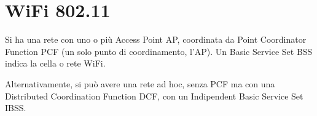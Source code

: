 \section{WiFi 802.11}

Si ha una rete con uno o più Access Point AP, coordinata da Point Coordinator Function PCF (un solo punto di coordinamento, l'AP). Un Basic Service Set BSS indica la cella o rete WiFi.

Alternativamente, si può avere una rete ad hoc, senza PCF ma con una Distributed Coordination Function DCF, con un Indipendent Basic Service Set IBSS.

